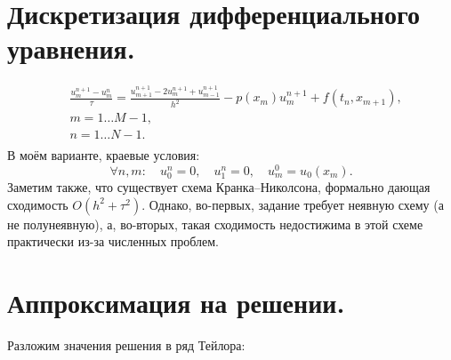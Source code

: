 \documentclass[14pt,a4paper]{extarticle}
\newcommand{\1}{\mathbbm{1}}
\begin{document}
\section{Дискретизация дифференциального уравнения.}
\begin{align} \label{scheme1}
    &\frac{u_m^{n+1} - u_m^n}{\tau} = \frac{u_{m+1}^{n+1} - 2 u_{m}^{n+1} + u_{m-1}^{n+1}}{h^2} - p(x_m) u_m^{n+1} + f(t_{n}, x_{m+1}),\\ 
    & m = 1 \ldots M-1, \\
    & n = 1 \ldots N-1. \\
\end{align}
В моём варианте, краевые условия:
\begin{equation} \label{schemeedge}
    \forall n, m: \quad u_0^{n} = 0, \quad u_1^{n} = 0, \quad u_m^{0} = u_0(x_m). 
\end{equation}
Заметим также, что существует схема Кранка--Николсона, формально дающая сходимость $O(h^2 + \tau^2)$. Однако, во-первых, задание требует неявную 
схему (а не полунеявную), а, во-вторых, такая сходимость недостижима в этой схеме практически из-за численных проблем.
\section{Аппроксимация на решении.}
Разложим значения решения в ряд Тейлора:
\end{document}
